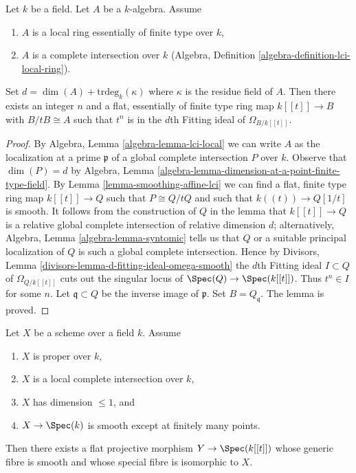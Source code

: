 \begin{lemma}
\label{lemma-smoothing-at-lci-point}
Let $k$ be a field. Let $A$ be a $k$-algebra. Assume
\begin{enumerate}
\item $A$ is a local ring essentially of finite type over $k$,
\item $A$ is a complete intersection over $k$
(Algebra, Definition \ref{algebra-definition-lci-local-ring}).
\end{enumerate}
Set $d = \dim(A) + \text{trdeg}_k(\kappa)$ where $\kappa$
is the residue field of $A$. Then there exists an integer $n$
and a flat, essentially of finite type ring map
$k[[t]] \to B$ with $B/tB \cong A$ such that $t^n$ is in the
$d$th Fitting ideal of $\Omega_{B/k[[t]]}$.
\end{lemma}

\begin{proof}
By Algebra, Lemma \ref{algebra-lemma-lci-local} we can write $A$ as the
localization at a prime $\mathfrak p$ of a global complete intersection $P$
over $k$. Observe that $\dim(P) = d$ by
Algebra, Lemma \ref{algebra-lemma-dimension-at-a-point-finite-type-field}.
By Lemma \ref{lemma-smoothing-affine-lci} we can find a
flat, finite type ring map $k[[t]] \to Q$ such that $P \cong Q/tQ$ and
such that $k((t)) \to Q[1/t]$ is smooth. It follows from the construction
of $Q$ in the lemma that $k[[t]] \to Q$ is a relative global
complete intersection of relative dimension $d$; alternatively,
Algebra, Lemma \ref{algebra-lemma-syntomic} tells us that $Q$ or a
suitable principal localization of $Q$ is such a global complete intersection.
Hence by Divisors, Lemma \ref{divisors-lemma-d-fitting-ideal-omega-smooth}
the $d$th Fitting ideal $I \subset Q$ of $\Omega_{Q/k[[t]]}$
cuts out the singular locus of $\Spec(Q) \to \Spec(k[[t]])$.
Thus $t^n \in I$ for some $n$.
Let $\mathfrak q \subset Q$
be the inverse image of $\mathfrak p$. Set $B = Q_\mathfrak q$.
The lemma is proved.
\end{proof}

\begin{lemma}
\label{lemma-smoothing-proper-curve-isolated-lci}
Let $X$ be a scheme over a field $k$. Assume
\begin{enumerate}
\item $X$ is proper over $k$,
\item $X$ is a local complete intersection over $k$,
\item $X$ has dimension $\leq 1$, and
\item $X \to \Spec(k)$ is smooth except at finitely many points.
\end{enumerate}
Then there exists a flat projective morphism $Y \to \Spec(k[[t]])$
whose generic fibre is smooth and whose special fibre is
isomorphic to $X$.
\end{lemma}

